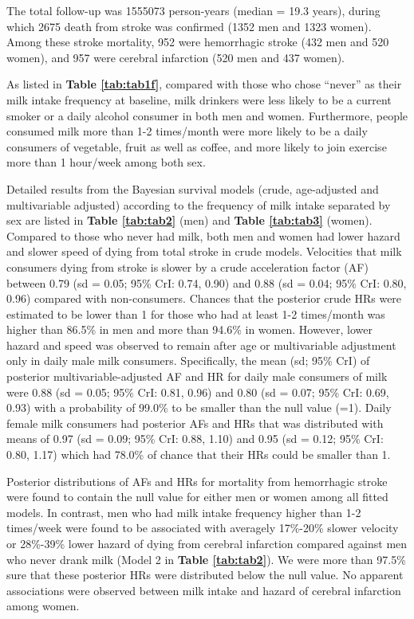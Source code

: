 \documentclass[nutrients,article,submit,moreauthors,pdftex]{mdpi}
\begin{document}
The total follow-up was 1555073 person-years (median = 19.3 years),
during which 2675 death from stroke was confirmed (1352 men and 1323
women). Among these stroke mortality, 952 were hemorrhagic stroke (432
men and 520 women), and 957 were cerebral infarction (520 men and 437
women).

As listed in \textbf{Table \ref{tab:tab1f}}, compared with those who
chose ``never'' as their milk intake frequency at baseline, milk
drinkers were less likely to be a current smoker or a daily alcohol
consumer in both men and women. Furthermore, people consumed milk more
than 1-2 times/month were more likely to be a daily consumers of
vegetable, fruit as well as coffee, and more likely to join exercise
more than 1 hour/week among both sex.

Detailed results from the Bayesian survival models (crude, age-adjusted
and multivariable adjusted) according to the frequency of milk intake
separated by sex are listed in \textbf{Table \ref{tab:tab2}} (men) and
\textbf{Table \ref{tab:tab3}} (women). Compared to those who never had
milk, both men and women had lower hazard and slower speed of dying from
total stroke in crude models. Velocities that milk consumers dying from
stroke is slower by a crude acceleration factor (AF) between 0.79 (sd =
0.05; 95\% CrI: 0.74, 0.90) and 0.88 (sd = 0.04; 95\% CrI: 0.80, 0.96)
compared with non-consumers. Chances that the posterior crude HRs were
estimated to be lower than 1 for those who had at least 1-2 times/month
was higher than 86.5\% in men and more than 94.6\% in women. However,
lower hazard and speed was observed to remain after age or multivariable
adjustment only in daily male milk consumers. Specifically, the mean
(sd; 95\% CrI) of posterior multivariable-adjusted AF and HR for daily
male consumers of milk were 0.88 (sd = 0.05; 95\% CrI: 0.81, 0.96) and
0.80 (sd = 0.07; 95\% CrI: 0.69, 0.93) with a probability of 99.0\% to
be smaller than the null value (=1). Daily female milk consumers had
posterior AFs and HRs that was distributed with means of 0.97 (sd =
0.09; 95\% CrI: 0.88, 1.10) and 0.95 (sd = 0.12; 95\% CrI: 0.80, 1.17)
which had 78.0\% of chance that their HRs could be smaller than 1.

Posterior distributions of AFs and HRs for mortality from hemorrhagic
stroke were found to contain the null value for either men or women
among all fitted models. In contrast, men who had milk intake frequency
higher than 1-2 times/week were found to be associated with averagely
17\%-20\% slower velocity or 28\%-39\% lower hazard of dying from
cerebral infarction compared against men who never drank milk (Model 2
in \textbf{Table \ref{tab:tab2}}). We were more than 97.5\% sure that
these posterior HRs were distributed below the null value. No apparent
associations were observed between milk intake and hazard of cerebral
infarction among women.
\end{document}
